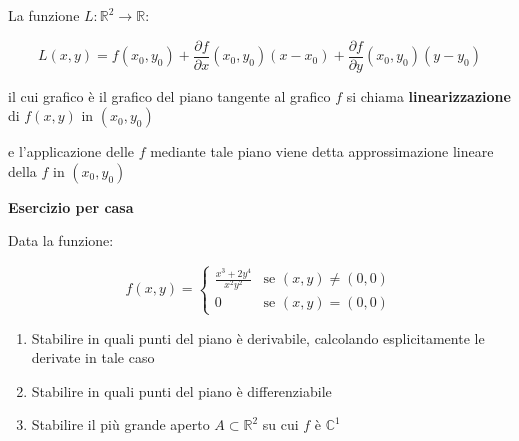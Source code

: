 \documentclass[11pt]{article}
\begin{document}
La funzione $L: \mathbb{R}^{2} \rightarrow \mathbb{R}$:

\[
    L(x,y) = f(x_0,y_0) + \frac{\partial f}{\partial x}(x_0,y_0) (x-x_0) + \frac{\partial f}{\partial y}(x_0,y_0) (y-y_0)
\]

il cui grafico è il grafico del piano tangente al grafico $f$ si chiama \textbf{linearizzazione} di $f(x,y)$ in $(x_0,y_0)$


e l'applicazione delle $f$ mediante tale piano viene detta approssimazione lineare della $f$ in $(x_0,y_0)$

\textbf{Esercizio per casa} 

Data la funzione:

\[
    f(x,y) = \begin{cases}
        \frac{x^{3}+2y^{4}}{x^{2}y^{2}} & \text{se $(x,y) \neq (0,0)$} \\
        0 & \text{se $(x,y) = (0,0)$}
    \end{cases}
\]

\begin{enumerate}
    \item Stabilire in quali punti del piano è derivabile, calcolando esplicitamente le derivate in tale caso
    \item Stabilire in quali punti del piano è differenziabile
    \item Stabilire il più grande aperto $A \subset \mathbb{R}^{2}$ su cui $f$ è $\mathbb{C}^{1}$
\end{enumerate}
\end{document}
